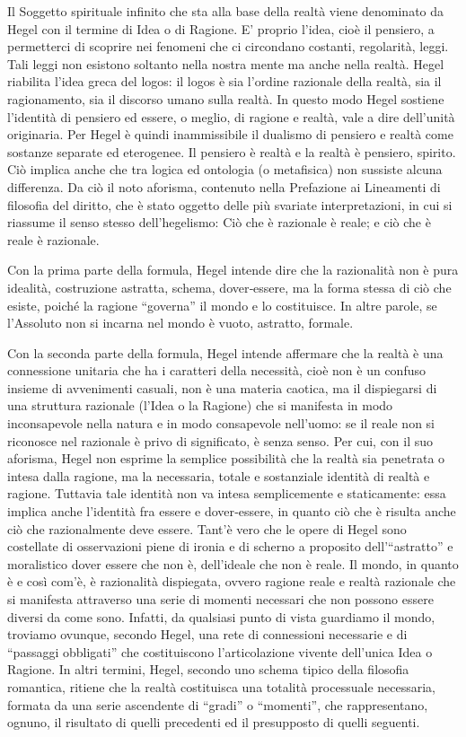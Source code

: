 \documentclass[a4paper,12pt,oneside,openany]{book}%
\begin{document}
Il Soggetto spirituale infinito che sta alla base della realtà viene denominato da Hegel con il termine di Idea o di Ragione. E’ proprio l’idea, cioè il pensiero, a permetterci di scoprire nei fenomeni che ci circondano costanti, regolarità, leggi. Tali leggi non esistono soltanto nella nostra mente ma anche nella realtà. Hegel riabilita l’idea greca del logos: il logos è sia l’ordine razionale della realtà, sia il ragionamento, sia il discorso umano sulla realtà.  In questo modo Hegel sostiene l’identità di pensiero ed essere, o meglio, di ragione e realtà, vale a dire dell’unità originaria. Per Hegel è quindi inammissibile il dualismo di pensiero e realtà come sostanze separate ed eterogenee. Il pensiero è realtà e la realtà è pensiero, spirito. Ciò implica anche che tra logica ed ontologia (o metafisica) non sussiste alcuna differenza. Da ciò il noto aforisma, contenuto nella Prefazione ai Lineamenti di filosofia del diritto, che è stato oggetto delle più svariate interpretazioni, in cui si riassume il senso stesso dell’hegelismo: Ciò che è razionale è reale; e ciò che è reale è razionale.

Con la prima parte della formula, Hegel intende dire che la razionalità non è pura idealità, costruzione astratta, schema, dover‑essere, ma la forma stessa di ciò che esiste, poiché la ragione “governa” il mondo e lo costituisce. In altre parole, se l’Assoluto non si incarna nel mondo è vuoto, astratto, formale.

Con la seconda parte della formula, Hegel intende affermare che la realtà è una connessione unitaria che ha i caratteri della necessità, cioè non è un confuso insieme di avvenimenti casuali, non è una materia caotica, ma il dispie­garsi di una struttura razionale (l’Idea o la Ragione) che si manifesta in modo inconsapevole nella natura e in modo consapevole nell’uomo: se il reale non si riconosce nel razionale è privo di significato, è senza senso. Per cui, con il suo aforisma, Hegel non esprime la semplice possibilità che la realtà sia penetrata o intesa dalla ragione, ma la necessaria, totale e sostanziale identità di realtà e ragione. Tuttavia tale identità non va intesa semplicemente e staticamente: essa implica anche l’identità fra essere e dover‑essere, in quanto ciò che è risulta anche ciò che razionalmente deve essere. Tant’è vero che le opere di Hegel sono costellate di osservazioni piene di ironia e di scherno a proposito dell’“astratto” e moralistico dover essere che non è, dell’ideale che non è reale. Il mondo, in quanto è e così com’è, è razionalità dispiegata, ovvero ragione reale e realtà razionale che si manifesta attraverso una serie di momenti necessari che non possono essere diversi da come sono. Infatti, da qualsiasi punto di vista guardiamo il mondo, troviamo ovunque, secondo Hegel, una rete di connessioni necessarie e di “passaggi obbligati” che costi­tuiscono l’articolazione vivente dell’unica Idea o Ragione. In altri termini, Hegel, secondo uno schema tipico della filosofia romantica, ritiene che la realtà costituisca una totalità processuale necessaria, formata da una serie ascendente di “gradi” o “momenti”, che rappresentano, ognuno, il risultato di quelli precedenti ed il presupposto di quelli seguenti.
\end{document}
